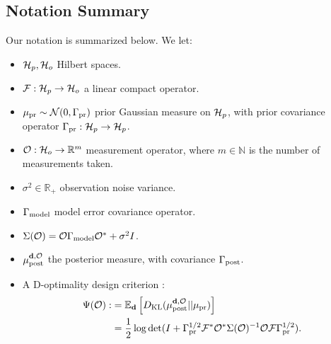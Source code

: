 \subsection{Notation Summary}\label{subsec:notation}
  Our notation is summarized below. We let:
  \begin{itemize}
  \item $\mathcal{H}_p, \mathcal{H}_o$ Hilbert spaces.
  \item $\mathcal{F}:\mathcal{H}_p \to \mathcal{H}_o$ a linear compact operator.
  \item $\mu_{\textup{pr}} \sim \mathcal{N}(0, \Gamma_{\textup{pr}})$ prior Gaussian measure on
    $\mathcal{H}_p$, with prior covariance operator $\Gamma_{\textup{pr}}:\mathcal{H}_p \to \mathcal{H}_p$.
  \item $\mathcal{O}: \mathcal{H}_o \to \mathbb{R}^m$ measurement operator, where $m
    \in \mathbb{N}$ is the number of measurements taken.
  \item $\sigma^2 \in \mathbb{R}_{+}$ observation noise variance.
  \item $\Gamma_{\textup{model}}$ model error covariance operator.
  \item $\Sigma(\mathcal{O}) = \mathcal{O} \Gamma_{\textup{model}} \mathcal{O}^* + \sigma^2I$. 
  \item $\mu_{\textup{post}}^{\mathbf{d}, \mathcal{O}}$ the posterior measure, with covariance $\Gamma_{\textup{post}}$.
  \item A D-optimality design criterion
    \cite{AlexanderianGloorGhattas14}:
    \begin{align*}
      \begin{split}
        \tar(\obs) :&= \mathbb{E}_{\data}\left [ D_{\text{KL}} (\post || \pr ) \right ] \\
        &= \frac12 \log \det ( I + \prcov^{1/2} \fwd ^* \obs^* \Sigma(\obs)^{-1} \obs
        \fwd \prcov^{1/2}).
      \end{split}
    \end{align*}
  \end{itemize}



